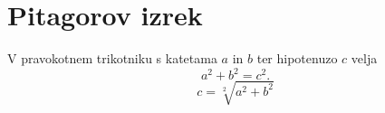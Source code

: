 \documentclass{article}
\begin{document}
\section*{Pitagorov izrek}
V pravokotnem trikotniku s katetama \(a\) in \(b\) ter hipotenuzo \(c\) velja
\[ a^2 + b^2 = c^2. \]
\[ c =\sqrt[2]{a^2+b^2}\]
\end{document}
